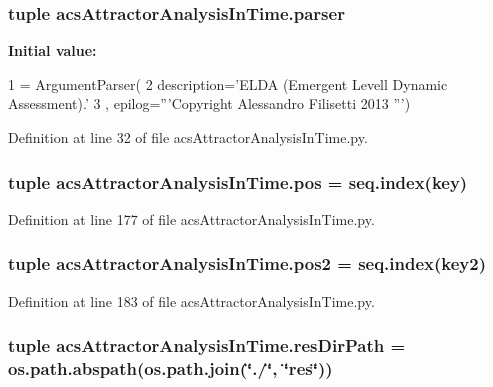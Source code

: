 \hypertarget{a00125_abed547533f84e18ca5b4c4a2cfaef63a}{
\subsubsection[{parser}]{\setlength{\rightskip}{0pt plus 5cm}tuple acs\+Attractor\+Analysis\+In\+Time.\+parser}}\label{a00125_abed547533f84e18ca5b4c4a2cfaef63a}
{\bfseries Initial value\+:}
\begin{DoxyCode}
1 = ArgumentParser(
2                                 description=\textcolor{stringliteral}{'ELDA (Emergent Levell Dynamic       Assessment).'}
3                                 , epilog=\textcolor{stringliteral}{'''Copyright Alessandro Filisetti 2013 '''})
\end{DoxyCode}


Definition at line 32 of file acs\+Attractor\+Analysis\+In\+Time.\+py.

\hypertarget{a00125_aa39692272363cd6f687c4b2a53f96594}{
\subsubsection[{pos}]{\setlength{\rightskip}{0pt plus 5cm}tuple acs\+Attractor\+Analysis\+In\+Time.\+pos = {\bf seq.\+index}(key)}}\label{a00125_aa39692272363cd6f687c4b2a53f96594}


Definition at line 177 of file acs\+Attractor\+Analysis\+In\+Time.\+py.

\hypertarget{a00125_a49fec7e1deea4728b5ef4a487d155de9}{
\subsubsection[{pos2}]{\setlength{\rightskip}{0pt plus 5cm}tuple acs\+Attractor\+Analysis\+In\+Time.\+pos2 = {\bf seq.\+index}(key2)}}\label{a00125_a49fec7e1deea4728b5ef4a487d155de9}


Definition at line 183 of file acs\+Attractor\+Analysis\+In\+Time.\+py.

\hypertarget{a00125_a28ca19f0f566396ef664e068a41a2837}{
\subsubsection[{res\+Dir\+Path}]{\setlength{\rightskip}{0pt plus 5cm}tuple acs\+Attractor\+Analysis\+In\+Time.\+res\+Dir\+Path = os.\+path.\+abspath(os.\+path.\+join(\char`\"{}./\char`\"{}, \char`\"{}res\char`\"{}))}}\label{a00125_a28ca19f0f566396ef664e068a41a2837}


